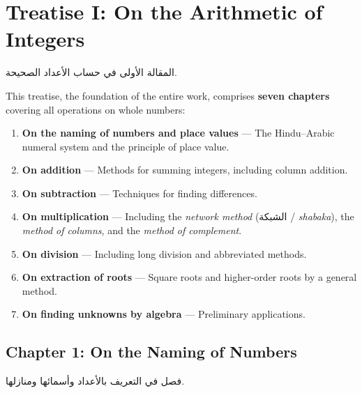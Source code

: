 \documentclass[11pt,a4paper]{article}
\newenvironment{arabicbox}{%
  \begin{framed}
  \begin{minipage}{\dimexpr\linewidth-2\fboxsep-2\fboxrule\relax}
  \setlength{\parindent}{0pt}
  \linespread{1.3}\selectfont
}{%
  \end{minipage}
  \end{framed}
}
\newcommand{\ar}[1]{{\arabicfont\beginR #1\endR}}
\begin{document}
\section{Treatise I: On the Arithmetic of Integers}
\label{sec:treatise1}

\begin{arabicbox}
\begin{Arabic}
المقالة الأولى في حساب الأعداد الصحيحة.
\end{Arabic}
\end{arabicbox}

\vspace{0.3cm}

\noindent This treatise, the foundation of the entire work, comprises
\textbf{seven chapters} covering all operations on whole numbers:

\begin{enumerate}[label=\textbf{Ch.\arabic*:}]
  \item \textbf{On the naming of numbers and place values} --- The
  Hindu--Arabic numeral system and the principle of place value.
  \item \textbf{On addition} --- Methods for summing integers, including
  column addition.
  \item \textbf{On subtraction} --- Techniques for finding differences.
  \item \textbf{On multiplication} --- Including the \textit{network
  method} (\ar{الشبكة} / \textit{shabaka}), the \textit{method of
columns}, and the \textit{method of complement}.
  \item \textbf{On division} --- Including long division and abbreviated
  methods.
  \item \textbf{On extraction of roots} --- Square roots and higher-order
  roots by a general method.
  \item \textbf{On finding unknowns by algebra} --- Preliminary
  applications.
\end{enumerate}

\subsection{Chapter 1: On the Naming of Numbers}

\begin{arabicbox}
\begin{Arabic}
فصل في التعريف بالأعداد وأسمائها ومنازلها.
\end{Arabic}
\end{arabicbox}
\end{document}
